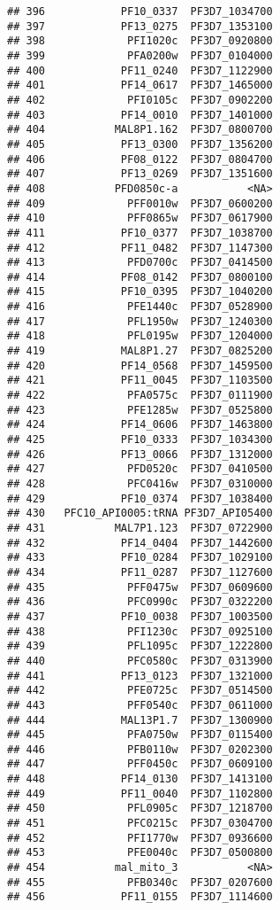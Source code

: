 \documentclass[12pt, a4paper]{article}\usepackage[]{graphicx}\usepackage[]{color}
\makeatletter
\newenvironment{kframe}{%
 \def\at@end@of@kframe{}%
 \ifinner\ifhmode%
  \def\at@end@of@kframe{\end{minipage}}%
  \begin{minipage}{\columnwidth}%
 \fi\fi%
 \def\FrameCommand##1{\hskip\@totalleftmargin \hskip-\fboxsep
 \colorbox{shadecolor}{##1}\hskip-\fboxsep
     \hskip-\linewidth \hskip-\@totalleftmargin \hskip\columnwidth}%
 \MakeFramed {\advance\hsize-\width
   \@totalleftmargin\z@ \linewidth\hsize
   \@setminipage}}%
 {\par\unskip\endMakeFramed%
 \at@end@of@kframe}
\newenvironment{knitrout}{}{} %
\makeatother
\begin{document}
\begin{knitrout}
\begin{kframe}
\begin{verbatim}
## 396            PF10_0337  PF3D7_1034700
## 397            PF13_0275  PF3D7_1353100
## 398             PFI1020c  PF3D7_0920800
## 399             PFA0200w  PF3D7_0104000
## 400            PF11_0240  PF3D7_1122900
## 401            PF14_0617  PF3D7_1465000
## 402             PFI0105c  PF3D7_0902200
## 403            PF14_0010  PF3D7_1401000
## 404           MAL8P1.162  PF3D7_0800700
## 405            PF13_0300  PF3D7_1356200
## 406            PF08_0122  PF3D7_0804700
## 407            PF13_0269  PF3D7_1351600
## 408           PFD0850c-a           <NA>
## 409             PFF0010w  PF3D7_0600200
## 410             PFF0865w  PF3D7_0617900
## 411            PF10_0377  PF3D7_1038700
## 412            PF11_0482  PF3D7_1147300
## 413             PFD0700c  PF3D7_0414500
## 414            PF08_0142  PF3D7_0800100
## 415            PF10_0395  PF3D7_1040200
## 416             PFE1440c  PF3D7_0528900
## 417             PFL1950w  PF3D7_1240300
## 418             PFL0195w  PF3D7_1204000
## 419            MAL8P1.27  PF3D7_0825200
## 420            PF14_0568  PF3D7_1459500
## 421            PF11_0045  PF3D7_1103500
## 422             PFA0575c  PF3D7_0111900
## 423             PFE1285w  PF3D7_0525800
## 424            PF14_0606  PF3D7_1463800
## 425            PF10_0333  PF3D7_1034300
## 426            PF13_0066  PF3D7_1312000
## 427             PFD0520c  PF3D7_0410500
## 428             PFC0416w  PF3D7_0310000
## 429            PF10_0374  PF3D7_1038400
## 430   PFC10_API0005:tRNA PF3D7_API05400
## 431           MAL7P1.123  PF3D7_0722900
## 432            PF14_0404  PF3D7_1442600
## 433            PF10_0284  PF3D7_1029100
## 434            PF11_0287  PF3D7_1127600
## 435             PFF0475w  PF3D7_0609600
## 436             PFC0990c  PF3D7_0322200
## 437            PF10_0038  PF3D7_1003500
## 438             PFI1230c  PF3D7_0925100
## 439             PFL1095c  PF3D7_1222800
## 440             PFC0580c  PF3D7_0313900
## 441            PF13_0123  PF3D7_1321000
## 442             PFE0725c  PF3D7_0514500
## 443             PFF0540c  PF3D7_0611000
## 444            MAL13P1.7  PF3D7_1300900
## 445             PFA0750w  PF3D7_0115400
## 446             PFB0110w  PF3D7_0202300
## 447             PFF0450c  PF3D7_0609100
## 448            PF14_0130  PF3D7_1413100
## 449            PF11_0040  PF3D7_1102800
## 450             PFL0905c  PF3D7_1218700
## 451             PFC0215c  PF3D7_0304700
## 452             PFI1770w  PF3D7_0936600
## 453             PFE0040c  PF3D7_0500800
## 454           mal_mito_3           <NA>
## 455             PFB0340c  PF3D7_0207600
## 456            PF11_0155  PF3D7_1114600

\end{verbatim}
\end{kframe}
\end{knitrout}
\end{document}

